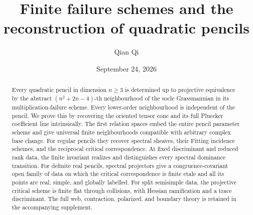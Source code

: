 \title[Finite failure schemes and quadratic pencils]{Finite failure schemes and the reconstruction of quadratic pencils}
\author{Qian Qi}
\date{September 24, 2026}
\begin{abstract}
Every quadratic pencil in dimension \(n\ge3\) is determined up to
projective equivalence by the abstract \((n^2+2n-4)\)-th neighbourhood
of the socle Grassmannian in its multiplication-failure scheme.
Every lower-order neighbourhood is independent of the pencil.
We prove this by recovering the oriented tensor cone and its full
Pluecker coefficient line intrinsically.  The first relation spaces
embed the entire pencil parameter scheme and give universal finite
neighbourhoods compatible with arbitrary complex base change.
For regular pencils they recover spectral sheaves, their Fitting
incidence schemes, and the reciprocal critical correspondence.
At fixed discriminant and reduced rank data, the finite invariant
realizes and distinguishes every spectral dominance transition.
For definite real pencils, spectral projectors give a congruence-covariant
open family of data on which the critical correspondence is finite
etale and all its points are real, simple, and globally labelled.
For split semisimple data, the projective critical scheme is finite flat
through collisions, with Hessian ramification and a trace discriminant.
The full web, contraction, polarized, and boundary theory is retained
in the accompanying supplement.
\end{abstract}
\maketitle
